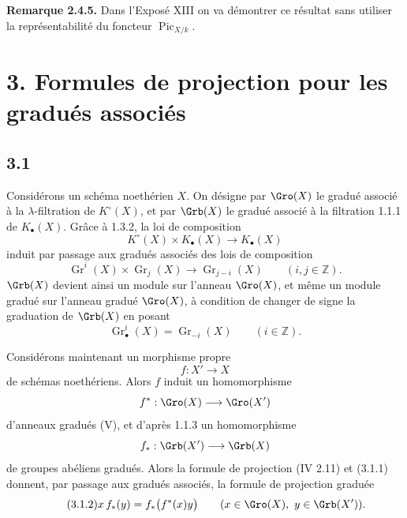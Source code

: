 \documentclass[11pt]{article}
\newcommand{\Gr}{\operatorname{Gr}}
\providecommand{\Pic}{\operatorname{Pic}}
\providecommand{\Gr}{\operatorname{Gr}}
\providecommand{\Gr}{\operatorname{G}}
\begin{document}
\textbf{Remarque 2.4.5.} Dans l'Exposé XIII on va démontrer ce résultat sans utiliser la représentabilité du foncteur \(\Pic_{X/k}\).

\section*{3. Formules de projection pour les gradués associés}

\subsection*{3.1}
Considérons un schéma noethérien \(X\). On désigne par \(\Gro(X)\) le gradué associé à la \(\lambda\)-filtration de \(K^\circ(X)\), et par \(\Grb(X)\) le gradué associé à la filtration 1.1.1 de \(K_\bullet(X)\). Grâce à 1.3.2, la loi de composition
\[
 K^\circ(X)\times K_\bullet(X)\longrightarrow K_\bullet(X)
\]
induit par passage aux gradués associés des lois de composition
\begin{equation}\tag{3.1.1}
 \Gr^i(X)\times\Gr_j(X)\longrightarrow \Gr_{j-i}(X)\qquad(i,j\in\mathbb Z).
\end{equation}
\(\Grb(X)\) devient ainsi un module sur l'anneau \(\Gro(X)\), et même un module gradué sur l'anneau gradué \(\Gro(X)\), à condition de changer de signe la graduation de \(\Grb(X)\) en posant
\[
 \Gr^i_\bullet(X)=\Gr_{-i}(X)\qquad(i\in\mathbb Z).
\]

Considérons maintenant un morphisme propre
\[
 f:X'\longrightarrow X
\]
de schémas noethériens. Alors \(f\) induit un homomorphisme
\[
 f^*:\Gro(X)\longrightarrow\Gro(X')
\]
d'anneaux gradués (V), et d'après 1.1.3 un homomorphisme
\[
 f_*:\Grb(X')\longrightarrow\Grb(X)
\]
de groupes abéliens gradués. Alors la formule de projection (IV 2.11) et (3.1.1) donnent, par passage aux gradués associés, la formule de projection graduée
\begin{equation}\tag{3.1.2}
 x\,f_*(y)=f_*\bigl(f^*(x)y\bigr)
 \qquad (x\in\Gro(X),\ y\in\Grb(X')).
\end{equation}
\end{document}
